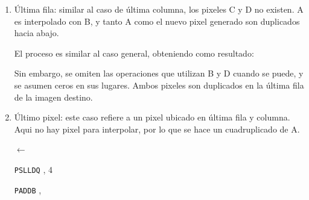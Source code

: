 \begin{enumerate}
  \item Última fila: similar al caso de última columna, los pixeles C y D no existen. A es interpolado con B, y tanto A como el nuevo pixel generado son duplicados hacia abajo.











  El proceso es similar al caso general, obteniendo como resultado:

  \begin{center}
     
  \end{center}

  Sin embargo, se omiten las operaciones que utilizan B y D cuando se puede, y se asumen ceros en sus lugares. Ambos pixeles son duplicados en la última fila de la imagen destino.

  \item Último pixel: este caso refiere a un pixel ubicado en última fila y columna. Aqui no hay pixel para interpolar, por lo que se hace un cuadruplicado de A.

  \begin{center}

     

     $\leftarrow$ 

    \texttt{PSLLDQ} , 4 \hfill

     

    \texttt{PADDB} ,  \hfill

     

  \end{center}

\end{enumerate}

